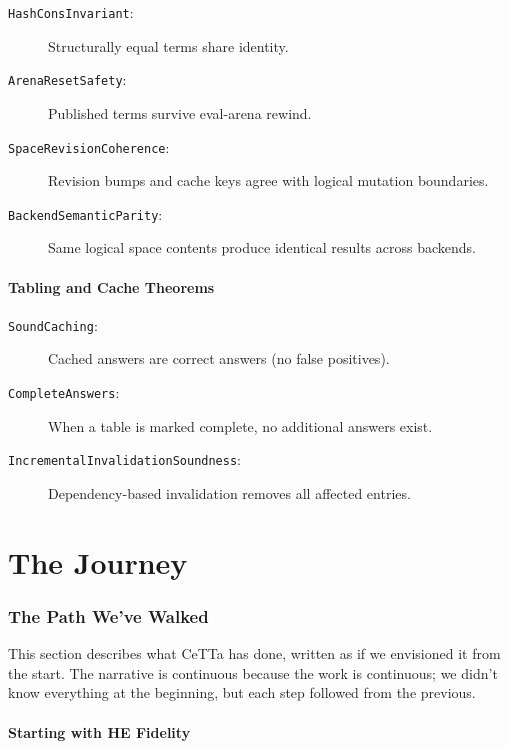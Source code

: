 \documentclass[11pt]{article}
\newcommand{\code}[1]{\texttt{#1}}
\newcommand{\CeTTa}{\textup{CeTTa}}
\begin{document}
\begin{description}
\item[\code{HashConsInvariant}:]
  Structurally equal terms share identity.
\item[\code{ArenaResetSafety}:]
  Published terms survive eval-arena rewind.
\item[\code{SpaceRevisionCoherence}:]
  Revision bumps and cache keys agree with logical mutation boundaries.
\item[\code{BackendSemanticParity}:]
  Same logical space contents produce identical results across backends.
\end{description}

\subsection{Tabling and Cache Theorems}

\begin{description}
\item[\code{SoundCaching}:]
  Cached answers are correct answers (no false positives).
\item[\code{CompleteAnswers}:]
  When a table is marked complete, no additional answers exist.
\item[\code{IncrementalInvalidationSoundness}:]
  Dependency-based invalidation removes all affected entries.
\end{description}

\part{The Journey}

\section{The Path We've Walked}
\label{sec:journey}

This section describes what \CeTTa{} has done, written as if we
envisioned it from the start.  The narrative is continuous because
the work is continuous; we didn't know everything at the beginning,
but each step followed from the previous.

\subsection{Starting with HE Fidelity}
\end{document}
